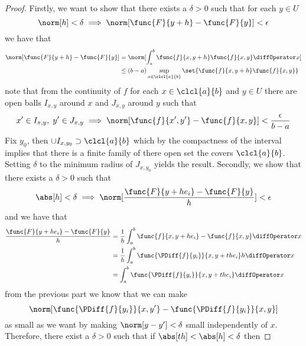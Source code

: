 \begin{proof}
    Firstly, we want to show that there exists a \(\delta > 0\) such that for each \(y \in U\)
    \begin{equation*}
        \norm[h] < \delta \implies  \norm[\func{F}{y + h} - \func{F}{y}] < \epsilon
    \end{equation*}
    we have that
    \begin{align*}
        \norm[\func{F}{y + h} - \func{F}{y}] & =  \norm[\int_{a}^{b} \func{f}{x,y+ h} \func{f}{x,y} \diffOperator x]    \\
                                             & \leq (b-a) \sup_{x \in \clcl{a}{b}} \set{\func{f}{x,y+ h} \func{f}{x,y}}
    \end{align*}
    note that from the continuity of \(f\) for each \(x \in \clcl{a}{b}\) and \(y \in U\) there are open balls \(I_{x,y}\) around \(x\) and \(J_{x,y}\) around \(y\) such that
    \begin{equation*}
        x' \in I_{x,y}, \; y' \in J_{x,y} \implies \norm[\func{f}{x',y'} - \func{f}{x,y}] < \dfrac{\epsilon}{b - a}
    \end{equation*}
    Fix \(y_0\), then \(\cup I_{x,y_0} \supset \clcl{a}{b}\) which by the compactness of the interval implies that there is a finite family of there open set the covers \(\clcl{a}{b}\). Setting \(\delta\) to the minimum radius of \(J_{x,y_0}\) yields the result.
    Secondly, we show that there exists a \(\delta > 0 \) such that
    \begin{equation*}
        \abs[h] < \delta \implies \norm[\dfrac{\func{F}{y + he_i} - \func{F}{y}}{h}] < \epsilon
    \end{equation*}
    and we have that
    \begin{align*}
        \dfrac{\func{F}{y + he_i} - \func{F}{y}}{h} & = \dfrac{1}{h}  \int_{a}^{b} \func{f}{x,y+ he_i} - \func{f}{x,y} \diffOperator x   \\
                                                    & =  \dfrac{1}{h}  \int_{a}^{b} \func{\PDiff{f}{y_i}}{x,y + the_i}h  \diffOperator x \\
                                                    & = \int_{a}^{b} \func{\PDiff{f}{y_i}}{x,y + the_i}  \diffOperator x
    \end{align*}
    from the previous part we know that we can make
    \begin{equation*}
        \norm[\func{\PDiff{f}{y_i}}{x,y'} - \func{\PDiff{f}{y_i}}{x,y}]
    \end{equation*}
    as small as we want by making \(\norm[y - y'] < \delta\) small independently of \(x\). Therefore, there exist a \(\delta > 0\) such that if \(\abs[th] < \abs[h] < \delta\) then

\end{proof}
